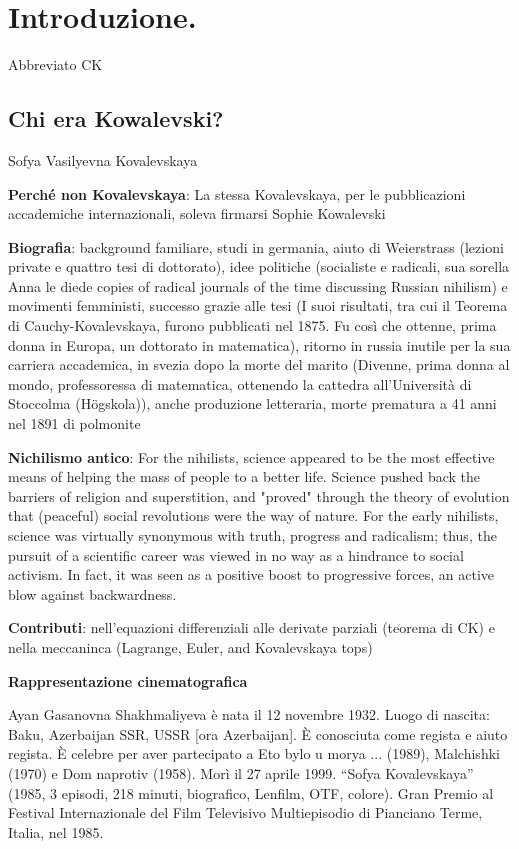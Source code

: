 \chapter{Introduzione.}
Abbreviato CK

\section{Chi era Kowalevski?}

Sofya Vasilyevna Kovalevskaya

\textbf{Perché non Kovalevskaya}:  La stessa Kovalevskaya, per le pubblicazioni accademiche internazionali, soleva firmarsi Sophie Kowalevski

\textbf{Biografia}: background familiare, studi in germania, aiuto di Weierstrass (lezioni private e quattro tesi di dottorato), idee politiche (socialiste e radicali, sua sorella Anna le diede copies of radical journals of the time discussing Russian nihilism) e movimenti femministi, successo grazie alle tesi (I suoi risultati, tra cui il Teorema di Cauchy-Kovalevskaya, furono pubblicati nel 1875. Fu così che ottenne, prima donna in Europa, un dottorato in matematica), ritorno in russia inutile per la sua carriera accademica, in svezia dopo la morte del marito (Divenne, prima donna al mondo, professoressa di matematica, ottenendo la cattedra all'Università di Stoccolma (Högskola)), anche produzione letteraria, morte prematura a 41 anni nel 1891 di polmonite

\textbf{Nichilismo antico}: For the nihilists, science appeared to be the most effective means of helping the mass of people to a better life. Science pushed back the barriers of religion and superstition, and "proved" through the theory of evolution that (peaceful) social revolutions were the way of nature. For the early nihilists, science was virtually synonymous with truth, progress and radicalism; thus, the pursuit of a scientific career was viewed in no way as a hindrance to social activism. In fact, it was seen as a positive boost to progressive forces, an active blow against backwardness.

\textbf{Contributi}: nell'equazioni differenziali alle derivate parziali (teorema di CK) e nella meccaninca (Lagrange, Euler, and Kovalevskaya tops)

\textbf{Rappresentazione cinematografica}

Ayan Gasanovna Shakhmaliyeva è nata il 12 novembre 1932. Luogo di nascita: Baku, Azerbaijan SSR, USSR [ora Azerbaijan]. È conosciuta come regista e aiuto regista. È celebre per aver partecipato a Eto bylo u morya ... (1989), Malchishki (1970) e Dom naprotiv (1958). Morì il 27 aprile 1999. “Sofya Kovalevskaya” (1985, 3 episodi, 218 minuti, biografico, Lenfilm, OTF, colore). Gran Premio al Festival Internazionale del Film Televisivo Multiepisodio di Pianciano Terme, Italia, nel 1985.


